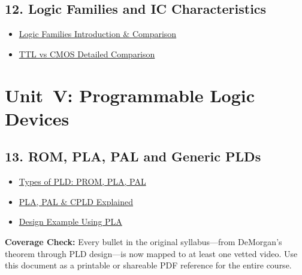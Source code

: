 \documentclass{article}
\begin{document}
\subsection*{12. Logic Families and IC Characteristics}
\begin{itemize}
  \item \href{https://www.youtube.com/watch?v=UZ8-YCK21Fo}{Logic Families Introduction \& Comparison}
  \item \href{https://www.youtube.com/watch?v=_C79WYFR8TM}{TTL vs CMOS Detailed Comparison}
\end{itemize}

\section*{Unit~V: Programmable Logic Devices}
\subsection*{13. ROM, PLA, PAL and Generic PLDs}
\begin{itemize}
  \item \href{https://www.youtube.com/watch?v=x-sLroyas50}{Types of PLD: PROM, PLA, PAL}
  \item \href{https://www.youtube.com/watch?v=35I-xzjukH8}{PLA, PAL \& CPLD Explained}
  \item \href{https://www.youtube.com/watch?v=y7s-TA1Wsz0}{Design Example Using PLA}
\end{itemize}

\bigskip
\noindent\textbf{Coverage Check:} Every bullet in the original syllabus---from DeMorgan’s theorem through PLD design---is now mapped to at least one vetted video.  Use this document as a printable or shareable PDF reference for the entire course.
\end{document}
